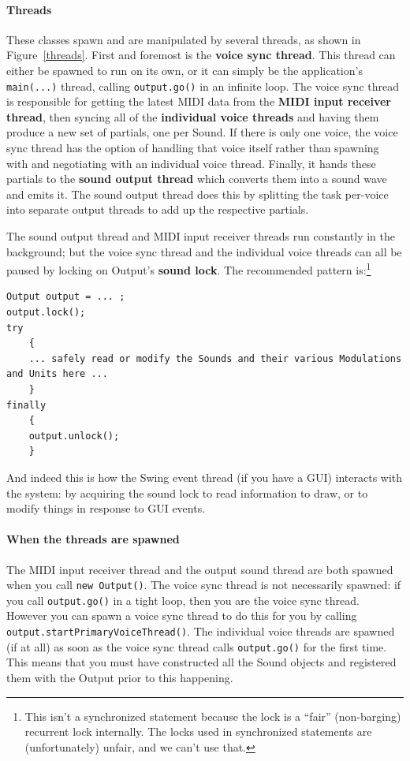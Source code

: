 \documentclass{article}
\begin{document}
\paragraph{Threads} These classes spawn and are manipulated by several threads, as shown in Figure~\ref{threads}.  First and foremost is the {\bf voice sync thread}.  This thread can either be spawned to run on its own, or it can simply be the application's \texttt{main(...)} thread, calling \texttt{output.go()} in an infinite loop.  The voice sync thread is responsible for getting the latest MIDI data from the {\bf MIDI input receiver thread}, then syncing all of the {\bf individual voice threads} and having them produce a new set of partials, one per Sound.  If there is only one voice, the voice sync thread has the option of handling that voice itself rather than spawning with and negotiating with an individual voice thread.  Finally, it hands these partials to the {\bf sound output thread} which converts them into a sound wave and emits it.  The sound output thread does this by splitting the task per-voice into separate output threads to add up the respective partials.

The sound output thread and MIDI input receiver threads run constantly in the background; but the voice sync thread and the individual voice threads can all be paused by locking on Output's {\bf sound lock}.  The recommended pattern is:\footnote{This isn't a synchronized statement because the lock is a ``fair'' (non-barging) recurrent lock internally.  The locks used in synchronized statements are (unfortunately) unfair, and we can't use that.}

\begin{verbatim}
Output output = ... ;
output.lock();
try
    {
    ... safely read or modify the Sounds and their various Modulations and Units here ...
    }
finally
    {
    output.unlock();
    }
\end{verbatim}

And indeed this is how the Swing event thread (if you have a GUI) interacts with the system: by acquiring the sound lock to read information to draw, or to modify things in response to GUI events.

\paragraph{When the threads are spawned}  The MIDI input receiver thread and the output sound thread are both spawned when you call {\tt new Output()}.  The voice sync thread is not necessarily spawned: if you call {\tt output.go()} in a tight loop, then you are the voice sync thread.  However you can spawn a voice sync thread to do this for you by calling {\tt output.startPrimaryVoiceThread()}.  The individual voice threads are spawned (if at all) as soon as the voice sync thread calls {\tt output.go()} for the first time.  This means that you must have constructed all the Sound objects and registered them with the Output prior to this happening.
\end{document}
